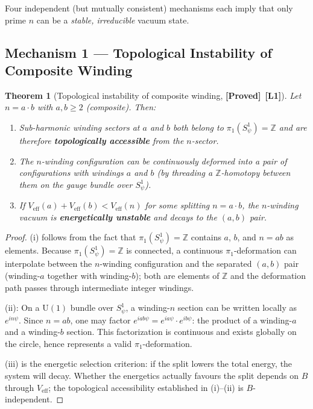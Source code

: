 \documentclass[12pt,a4paper]{article}
\newtheorem{theorem}{Theorem}[section]
\theoremstyle{definition}
\theoremstyle{remark}
\newcommand{\ZZ}{\mathbb{Z}}
\newcommand{\PROVED}{\textbf{[Proved]}}
\newcommand{\Lone}{\textbf{[L1]}}
\begin{document}
Four independent (but mutually consistent) mechanisms each imply that only
prime $n$ can be a \emph{stable, irreducible} vacuum state.

\subsection{Mechanism 1 — Topological Instability of Composite Winding}
\label{sec:psp:topology}

\begin{theorem}[Topological instability of composite winding, \PROVED\ \Lone]
\label{thm:psp:composite_unstable}
Let $n = a \cdot b$ with $a,b \geq 2$ (composite).  Then:
\begin{enumerate}
  \item[(i)] Sub-harmonic winding sectors at $a$ and $b$ both belong to
             $\pi_1(S^1_\psi) = \ZZ$ and are therefore \textbf{topologically accessible}
             from the $n$-sector.
  \item[(ii)] The $n$-winding configuration can be continuously deformed
              into a pair of configurations with windings $a$ and $b$
              (by threading a $\ZZ$-homotopy between them on the gauge bundle
              over $S^1_\psi$).
  \item[(iii)] If $V_{\mathrm{eff}}(a) + V_{\mathrm{eff}}(b) < V_{\mathrm{eff}}(n)$
               for some splitting $n = a \cdot b$, the $n$-winding vacuum
               is \textbf{energetically unstable} and decays to the $(a,b)$ pair.
\end{enumerate}
\end{theorem}

\begin{proof}
(i) follows from the fact that $\pi_1(S^1_\psi) = \ZZ$ contains $a$, $b$, and $n = ab$
as elements.  Because $\pi_1(S^1_\psi) = \ZZ$ is connected, a continuous
$\pi_1$-deformation can interpolate between the $n$-winding configuration and
the separated $(a,b)$ pair (winding-$a$ together with winding-$b$); both are
elements of $\ZZ$ and the deformation path passes through intermediate integer
windings.

(ii): On a $\mathrm{U}(1)$ bundle over $S^1_\psi$, a winding-$n$ section can be
written locally as $e^{in\psi}$.  Since $n = ab$, one may factor
$e^{iab\psi} = e^{ia\psi}\cdot e^{ib\psi}$: the product of a winding-$a$ and a
winding-$b$ section.  This factorization is continuous and exists globally on the
circle, hence represents a valid $\pi_1$-deformation.

(iii) is the energetic selection criterion: if the split lowers the total energy,
the system will decay.  Whether the energetics actually favours the split depends on
$B$ through $V_{\mathrm{eff}}$; the topological accessibility established in (i)--(ii)
is $B$-independent.
\end{proof}
\end{document}
